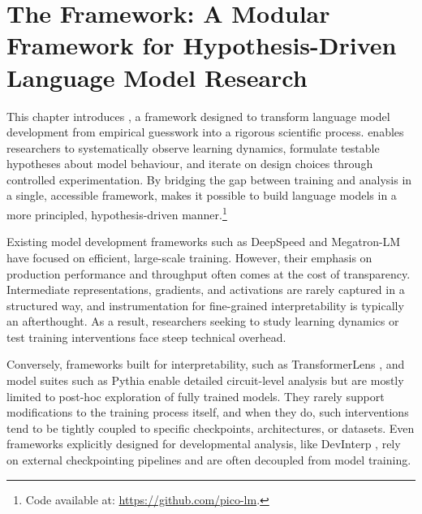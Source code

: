 \chapter[The \picomed Framework: A Modular Framework for Hypothesis-Driven Language Model Research]{The \picosupabig Framework: A Modular Framework for Hypothesis-Driven Language Model Research}
\label{chapter:pico}


This chapter introduces \pico, a framework designed to transform language model development from empirical guesswork into a rigorous scientific process. \pico enables researchers to systematically observe learning dynamics, formulate testable hypotheses about model behaviour, and iterate on design choices through controlled experimentation. By bridging the gap between training and analysis in a single, accessible framework, \pico makes it possible to build language models in a more principled, hypothesis-driven manner.\footnote{Code available at: \url{https://github.com/pico-lm}.} 

Existing model development frameworks such as DeepSpeed \citep{rasley2020deepspeed} and Megatron-LM \citep{narayanan2021megatron} have focused on efficient, large-scale training. However, their emphasis on production performance and throughput often comes at the cost of transparency. Intermediate representations, gradients, and activations are rarely captured in a structured way, and instrumentation for fine-grained interpretability is typically an afterthought. As a result, researchers seeking to study learning dynamics or test training interventions face steep technical overhead.

Conversely, frameworks built for interpretability, such as TransformerLens \citep{nanda2022transformerlens}, and model suites such as Pythia \citep{biderman2023pythia} enable detailed circuit-level analysis but are mostly limited to post-hoc exploration of fully trained models. They rarely support modifications to the training process itself, and when they do, such interventions tend to be tightly coupled to specific checkpoints, architectures, or datasets. Even frameworks explicitly designed for developmental analysis, like DevInterp \citep{devinterpcode}, rely on external checkpointing pipelines and are often decoupled from model training.

